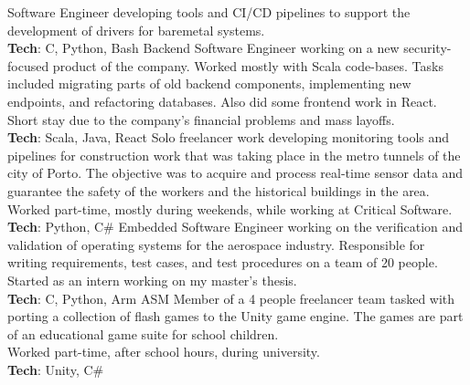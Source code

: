 \documentclass[letterpaper]{twentysecondcv} %
\begin{document}
\begin{twenty}
    {Software Engineer developing tools and CI/CD pipelines to support
    the development of drivers for baremetal systems.\\
    \textbf{Tech}: C, Python, Bash}
    {Backend Software Engineer working on a new security-focused product of
    the company. Worked mostly with Scala code-bases. Tasks included
    migrating parts of old backend components, implementing new endpoints, and
    refactoring databases. Also did some frontend work in React.\\
    Short stay due to the company's financial problems and mass layoffs.\\
    \textbf{Tech}: Scala, Java, React}
    {Solo freelancer work developing monitoring tools and pipelines for
    construction work that was taking place in the metro tunnels of the city of
    Porto. The objective was to acquire and process real-time sensor data and
    guarantee the safety of the workers and the historical buildings in the area.\\
    Worked part-time, mostly during weekends, while working at Critical Software.\\
    \textbf{Tech}: Python, C\#}
    {Embedded Software Engineer working on the verification and validation of
    operating systems for the aerospace industry. Responsible for writing
    requirements, test cases, and test procedures on a team of 20 people.\\
    Started as an intern working on my master's thesis.\\
    \textbf{Tech}: C, Python, Arm ASM}
    {Member of a 4 people freelancer team tasked with porting a collection
    of flash games to the Unity game engine. The games are part of an educational
    game suite for school children.\\
    Worked part-time, after school hours, during university.\\
    \textbf{Tech}: Unity, C\#}
\end{twenty}

\vfill

\end{document}
